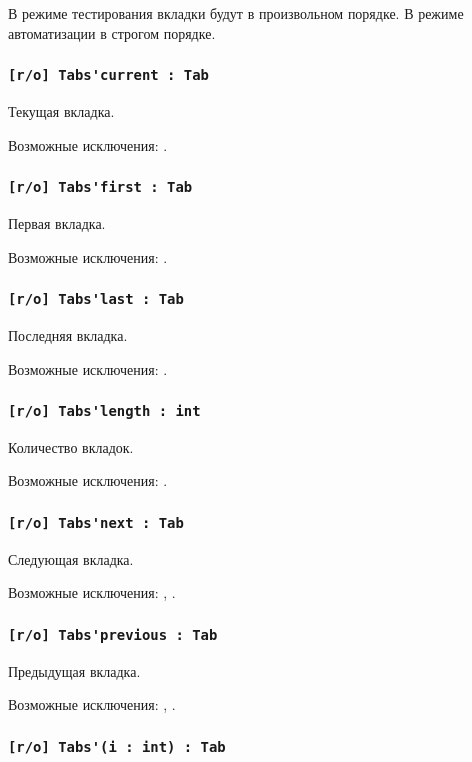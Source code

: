 В режиме тестирования вкладки будут в произвольном порядке. В режиме автоматизации в строгом порядке.

\subsubsection{\lstinline|[r/o] Tabs'current : Tab|}

Текущая вкладка.

Возможные исключения: .

\subsubsection{\lstinline|[r/o] Tabs'first : Tab|}

Первая вкладка.

Возможные исключения: .

\subsubsection{\lstinline|[r/o] Tabs'last : Tab|}

Последняя вкладка.

Возможные исключения: .

\subsubsection{\lstinline|[r/o] Tabs'length : int|}

Количество вкладок.

Возможные исключения: .

\subsubsection{\lstinline|[r/o] Tabs'next : Tab|}

Следующая вкладка.

Возможные исключения: , .

\subsubsection{\lstinline|[r/o] Tabs'previous : Tab|}

Предыдущая вкладка.

Возможные исключения: , .

\subsubsection{\lstinline|[r/o] Tabs'(i : int) : Tab|}

